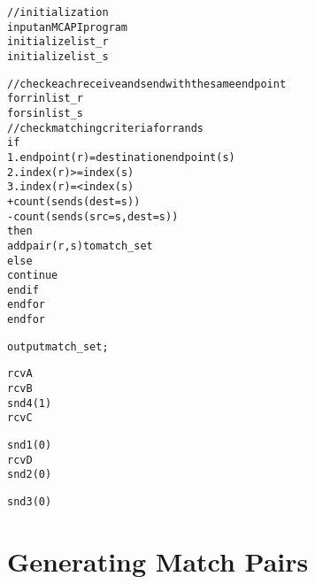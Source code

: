 
\newsavebox{\boxalgorithm}
\begin{lrbox}{\boxalgorithm}
\begin{minipage}[c]{1.4\linewidth}
\begin{alltt}
// initialization
input an MCAPI program
initialize list_r
initialize list_s

// check each receive and send with the same endpoint
for r in list_r
  for s in list_s
    // check matching criteria for r and s
    if
      1. endpoint(r) = destination endpoint(s)
      2. index(r) >= index(s)
      3. index(r) =< index(s) 
                     + count(sends(dest=s))
                     - count(sends(src=s, dest=s))
    then
      add pair (r, s) to match_set
    else
      continue
    end if
  end for
end for

output match_set;
\end{alltt}
\end{minipage}
\end{lrbox}

\newsavebox{\boxtaskzero}
\begin{lrbox}{\boxtaskzero}
\begin{minipage}[t]{0.2\linewidth}
\begin{alltt}
rcvA
rcvB
snd4(1)
rcvC
\end{alltt}
\end{minipage}
\end{lrbox}

\newsavebox{\boxtaskone}
\begin{lrbox}{\boxtaskone}
\begin{minipage}[t]{0.2\linewidth}
\begin{alltt}
snd1(0)
rcvD
snd2(0)
\end{alltt}
\end{minipage}
\end{lrbox}

\newsavebox{\boxtasktwo}
\begin{lrbox}{\boxtasktwo}
\begin{minipage}[t]{0.2\linewidth}
\begin{alltt}
snd3(0)
\end{alltt}
\end{minipage}
\end{lrbox}

\section{Generating Match Pairs} \label{sec:mp-gen}

